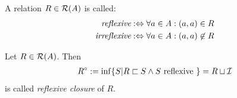 
\begin{definition}[Reflexivity]
A relation $R \in \mathcal{R}(A)$ is called:
\begin{align}
\emph{reflexive} 
&:\Leftrightarrow
\forall a \in A: (a,a) \in R
\\
\emph{irreflexive} 
&:\Leftrightarrow
\forall a \in A: (a,a) \not\in R
\end{align}
\end{definition}

\begin{definition}
Let $R \in \mathcal{R}(A)$.
Then
\begin{align}
R^\circ
:= \inf \{ S | R \sqsubset S \wedge S \text{ reflexive } \}
= R \sqcup \mathcal{I}
\end{align}
is called \emph{reflexive closure} of $R$.
\end{definition}

